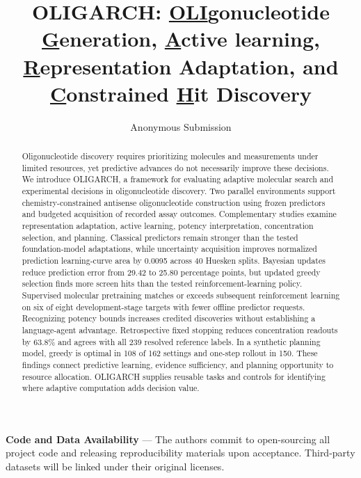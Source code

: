 \documentclass[letterpaper]{article}
\title{OLIGARCH: \underline{OLI}gonucleotide \underline{G}eneration, \underline{A}ctive learning, \underline{R}epresentation Adaptation, and \underline{C}onstrained \underline{H}it Discovery}
\author{Anonymous Submission}
\begin{document}
\maketitle

\noindent\textbf{Code and Data Availability} --- The authors commit to open-sourcing all project code and releasing reproducibility materials upon acceptance. Third-party datasets will be linked under their original licenses.

\begin{abstract}
Oligonucleotide discovery requires prioritizing molecules and measurements under limited resources, yet predictive advances do not necessarily improve these decisions. We introduce OLIGARCH, a framework for evaluating adaptive molecular search and experimental decisions in oligonucleotide discovery. Two parallel environments support chemistry-constrained antisense oligonucleotide construction using frozen predictors and budgeted acquisition of recorded assay outcomes. Complementary studies examine representation adaptation, active learning, potency interpretation, concentration selection, and planning. Classical predictors remain stronger than the tested foundation-model adaptations, while uncertainty acquisition improves normalized prediction learning-curve area by 0.0095 across 40 Huesken splits. Bayesian updates reduce prediction error from 29.42 to 25.80 percentage points, but updated greedy selection finds more screen hits than the tested reinforcement-learning policy. Supervised molecular pretraining matches or exceeds subsequent reinforcement learning on six of eight development-stage targets with fewer offline predictor requests. Recognizing potency bounds increases credited discoveries without establishing a language-agent advantage. Retrospective fixed stopping reduces concentration readouts by 63.8\% and agrees with all 239 resolved reference labels. In a synthetic planning model, greedy is optimal in 108 of 162 settings and one-step rollout in 150. These findings connect predictive learning, evidence sufficiency, and planning opportunity to resource allocation. OLIGARCH supplies reusable tasks and controls for identifying where adaptive computation adds decision value.

\end{abstract}
\end{document}
